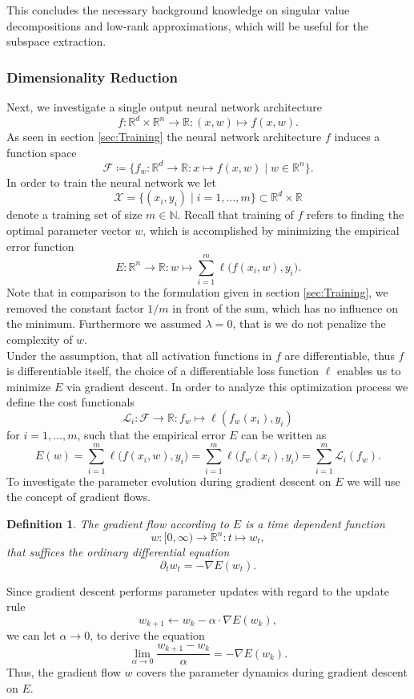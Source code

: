 \documentclass[11pt, a4paper]{article}
\newtheorem{definition}[theorem]{Definition}
\newcommand{\N}{\mathbb{N}}
\newcommand{\R}{\mathbb{R}}
\newcommand{\F}{\mathcal{F}}
\newcommand{\X}{\mathcal{X}}
\renewcommand{\L}{\mathcal{L}}
\begin{document}
This concludes the necessary background knowledge on singular value decompositions and low-rank approximations, which will be useful for the subspace extraction.

\subsubsection{Dimensionality Reduction}

Next, we investigate a single output neural network architecture 
\[ f: \R^d \times \R^n \to \R : (x,w) \mapsto f(x,w). \]
As seen in section \ref{sec:Training} the neural network architecture $f$ induces a function space
\[ \F \coloneq \Big \{ f_w : \R^d \to \R : x \mapsto f(x,w) \mid w \in \R^n \Big \}. \]
In order to train the neural network we let
\[ \X = \big \{ (x_i,y_i) \mid i=1, \dots, m \big \} \subset \R^d \times \R \] 
denote a training set of size $m \in \N$. Recall that training of $f$ refers to finding the optimal parameter vector $w$, which is accomplished by minimizing the empirical error function
\[ E : \R^n \to \R : w \mapsto \sum_{i=1}^{m} \ell \big (f(x_i,w), y_i \big ). \]
Note that in comparison to the formulation given in section \ref{sec:Training}, we removed the constant factor $1/m$ in front of the sum, which has no influence on the minimum. Furthermore we assumed $\lambda = 0$, that is we do not penalize the complexity of $w$. \\

Under the assumption, that all activation functions in $f$ are differentiable, thus $f$ is differentiable itself, the choice of a differentiable loss function $\ell$ enables us to minimize $E$ via gradient descent. In order to analyze this optimization process we define the cost functionals
\[ \L_i: \F \to \R : f_w \mapsto \ell(f_w(x_i),y_i) \]
for $i=1, \dots,m$, such that the empirical error $E$ can be written as
\[ E(w) = \sum_{i=1}^{m} \ell \big (f(x_i,w), y_i \big ) = \sum_{i=1}^{m} \ell \big (f_w(x_i), y_i \big ) = \sum_{i=1}^{m} \L_i(f_w). \]
To investigate the parameter evolution during gradient descent on $E$ we will use the concept of gradient flows.

\begin{definition} \label{def:flow}
The gradient flow according to $E$ is a time dependent function
\[ w: [0, \infty) \to \R^n : t \mapsto w_t, \]
that suffices the ordinary differential equation
\[ \partial_t w_t = - \nabla E(w_t). \]
\end{definition}

Since gradient descent performs parameter updates with regard to the update rule
\[ w_{k+1} \leftarrow w_k - \alpha \cdot \nabla E(w_k), \]
we can let $\alpha \to 0$, to derive the equation
\[ \lim_{\alpha \to 0} \frac{w_{k+1} - w_k}{\alpha} = - \nabla E(w_k). \]
Thus, the gradient flow $w$ covers the parameter dynamics during gradient descent on $E$.
\end{document}
